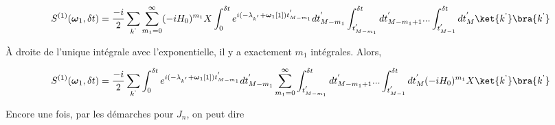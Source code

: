 \begin{equation*}
    S^{(1)}(\boldsymbol{\omega}_1, \delta t) = \frac{-i}{2}\sum_{k^\text{'}}\sum_{m_1 = 0}^{\infty}(-iH_0)^{m_1}X \int_{0}^{\delta t}e^{i(-\lambda_{k^{'}}+\boldsymbol{\omega}_1[1])t^{'}_{M-m_1}} dt_{M-m_1}^{'} \int_{t^{'}_{M-m_1}}^{\delta t} dt^{'}_{M-m_1+1} ... \int_{t^{'}_{M-1}}^{\delta t} dt^{'}_{M}  \ket{k^\text{'}}\bra{k^\text{'}}
\end{equation*}

À droite de l'unique intégrale avec l'exponentielle, il y a exactement $m_1$ intégrales. Alors, 

\begin{equation*}
    S^{(1)}(\boldsymbol{\omega}_1, \delta t) = \frac{-i}{2}\sum_{k^\text{'}} \int_{0}^{\delta t}e^{i(-\lambda_{k^{'}}+\boldsymbol{\omega}_1[1])t^{'}_{M-m_1}} dt_{M-m_1}^{'} \sum_{m_1 = 0}^{\infty}\int_{t^{'}_{M-m_1}}^{\delta t} dt^{'}_{M-m_1+1} ... \int_{t^{'}_{M-1}}^{\delta t} dt^{'}_{M}  (-iH_0)^{m_1}X\ket{k^\text{'}}\bra{k^\text{'}}
\end{equation*}

Encore une fois, par les démarches pour $J_n$, on peut dire

